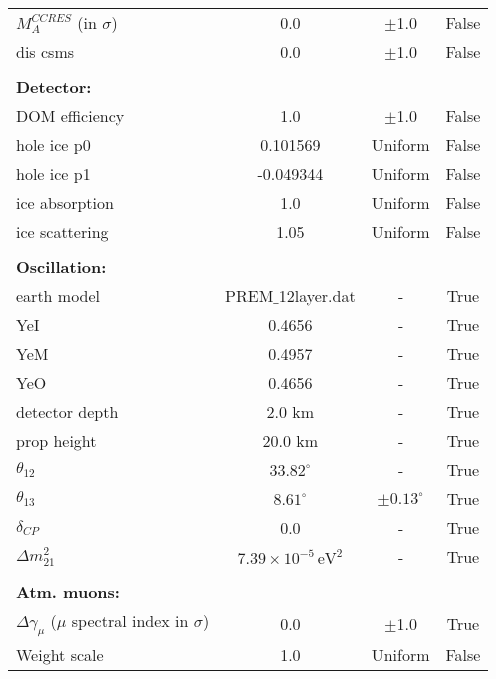 \begin{table}[htb]
\begin{tabular}{lccc}
$M_{A}^{CCRES}$ (in $\sigma$)& 0.0 & $\pm$1.0 & False  \\
dis csms & 0.0  & $\pm$1.0 & False \\ \hline
&&& \\ \hline
\textbf{Detector:}        &  & &  \\
DOM efficiency & 1.0  & $\pm$1.0 & False \\
hole ice p0 & 0.101569  & Uniform & False \\
hole ice p1 & -0.049344  & Uniform & False \\
ice absorption & 1.0  & Uniform & False \\
ice scattering & 1.05 & Uniform & False \\ \hline
&&& \\ \hline
\textbf{Oscillation:}   &     &    \\
earth model & PREM$\_$12layer.dat & - &  True \\
YeI & 0.4656 & - & True \\
YeM & 0.4957 & - & True \\
YeO & 0.4656 & - & True \\
detector depth & 2.0 km & - & True \\
prop height & 20.0 km  & - & True \\
$\theta_{12}$   & $33.82^{\circ}$  & - & True \\
$\theta_{13}$   & $8.61^{\circ}$  & $\pm0.13^{\circ}$ & True \\
$\delta_{CP}$   & 0.0  & - & True \\
$\Delta m^2_{21}$   & $7.39\times 10^{-5}\,\mathrm{eV}^2$  & - & True \\
\hline
&&& \\ \hline
\textbf{Atm. muons:}        &  &  &  \\
$\Delta \gamma_{\mu}$ ($\mu$ spectral index in $\sigma$)& 0.0  & $\pm$1.0 &  True \\
Weight scale & 1.0  & Uniform &  False \\
\hline \hline
\end{tabular}
\end{table}